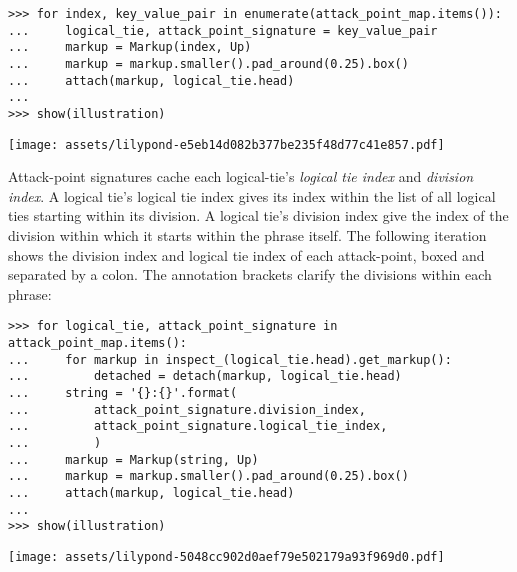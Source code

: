 \begin{abjadbookoutput}
\begin{singlespacing}
\vspace{-0.5\baselineskip}
\begin{verbatim}
>>> for index, key_value_pair in enumerate(attack_point_map.items()):
...     logical_tie, attack_point_signature = key_value_pair
...     markup = Markup(index, Up)
...     markup = markup.smaller().pad_around(0.25).box()
...     attach(markup, logical_tie.head)
...
>>> show(illustration)
\end{verbatim}
\noindent\texttt{[image: assets/lilypond-e5eb14d082b377be235f48d77c41e857.pdf]}
\end{singlespacing}
\end{abjadbookoutput}

\noindent Attack-point signatures cache each logical-tie's \emph{logical tie
index} and \emph{division index}. A logical tie's logical tie index gives its
index within the list of all logical ties starting within its division. A
logical tie's division index give the index of the division within which it
starts within the phrase itself. The following iteration shows the division
index and logical tie index of each attack-point, boxed and separated by a
colon. The annotation brackets clarify the divisions within each phrase:

\begin{comment}
<abjad>[stylesheet=../consort.ily]
for logical_tie, attack_point_signature in attack_point_map.items():
    for markup in inspect_(logical_tie.head).get_markup():
        detached = detach(markup, logical_tie.head)
    string = '{}:{}'.format(
        attack_point_signature.division_index,
        attack_point_signature.logical_tie_index,
        )
    markup = Markup(string, Up)
    markup = markup.smaller().pad_around(0.25).box()
    attach(markup, logical_tie.head)

show(illustration)
</abjad>
\end{comment}

\begin{abjadbookoutput}
\begin{singlespacing}
\vspace{-0.5\baselineskip}
\begin{verbatim}
>>> for logical_tie, attack_point_signature in attack_point_map.items():
...     for markup in inspect_(logical_tie.head).get_markup():
...         detached = detach(markup, logical_tie.head)
...     string = '{}:{}'.format(
...         attack_point_signature.division_index,
...         attack_point_signature.logical_tie_index,
...         )
...     markup = Markup(string, Up)
...     markup = markup.smaller().pad_around(0.25).box()
...     attach(markup, logical_tie.head)
...
>>> show(illustration)
\end{verbatim}
\noindent\texttt{[image: assets/lilypond-5048cc902d0aef79e502179a93f969d0.pdf]}
\end{singlespacing}
\end{abjadbookoutput}

